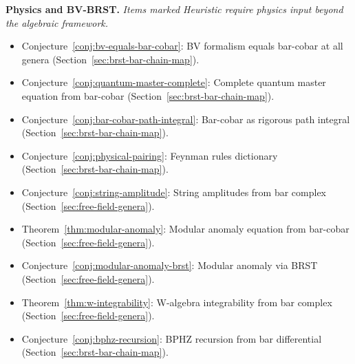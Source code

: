 \smallskip
\noindent\textbf{Physics and BV-BRST.}
\emph{Items marked Heuristic require physics input beyond the algebraic framework.}

\begin{itemize}[nosep]
\item Conjecture~\ref{conj:bv-equals-bar-cobar}:
  BV formalism equals bar-cobar at all genera
  (Section~\ref{sec:brst-bar-chain-map}).
\item Conjecture~\ref{conj:quantum-master-complete}:
  Complete quantum master equation from bar-cobar
  (Section~\ref{sec:brst-bar-chain-map}).
\item Conjecture~\ref{conj:bar-cobar-path-integral}:
  Bar-cobar as rigorous path integral
  (Section~\ref{sec:brst-bar-chain-map}).
\item Conjecture~\ref{conj:physical-pairing}:
  Feynman rules dictionary
  (Section~\ref{sec:brst-bar-chain-map}).
\item Conjecture~\ref{conj:string-amplitude}:
  String amplitudes from bar complex
  (Section~\ref{sec:free-field-genera}).
\item Theorem~\ref{thm:modular-anomaly}:
  Modular anomaly equation from bar-cobar
  (Section~\ref{sec:free-field-genera}).
\item Conjecture~\ref{conj:modular-anomaly-brst}:
  Modular anomaly via BRST
  (Section~\ref{sec:free-field-genera}).
\item Theorem~\ref{thm:w-integrability}:
  W-algebra integrability from bar complex
  (Section~\ref{sec:free-field-genera}).
\item Conjecture~\ref{conj:bphz-recursion}:
  BPHZ recursion from bar differential
  (Section~\ref{sec:brst-bar-chain-map}).
\end{itemize}

